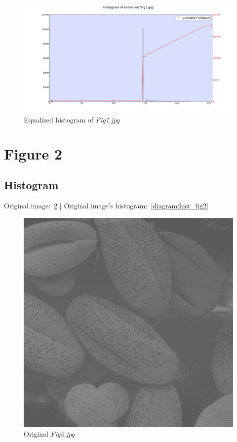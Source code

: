     \begin{figure}[!htb]\centering
        \includegraphics[width=\linewidth]{./images/1/Equalized_Histogram_Fig1.jpg}
        \caption{Equalized histogram of \textit{Fig1.jpg}}\label{diagram:equal_hist_fig1}
    \end{figure}


\pagebreak
\section{Figure 2}

    \subsection{Histogram}

    Original image:~\ref{diagram:fig2} |
    Original image's histogram:~\ref{diagram:hist_fig2}

    \begin{figure}[!htb]\centering
        \includegraphics[width=0.5\linewidth]{./images/1/Fig2.jpg}
        \caption{Original \textit{Fig2.jpg}}\label{diagram:fig2}
    \end{figure}

